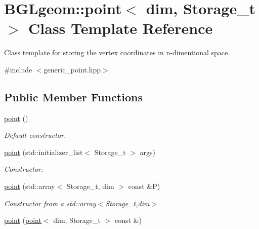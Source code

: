 \hypertarget{classBGLgeom_1_1point}{
\section{BGLgeom::point$<$ dim, Storage\_\-t $>$ Class Template Reference}
\label{classBGLgeom_1_1point}
}


Class template for storing the vertex coordinates in n-\/dimentional space.  


{\ttfamily \#include $<$generic\_\-point.hpp$>$}\subsection*{Public Member Functions}
\begin{DoxyCompactItemize}
\item 
\hypertarget{classBGLgeom_1_1point_a5d715364ccb806b626958305f83fce42}{
\hyperlink{classBGLgeom_1_1point_a5d715364ccb806b626958305f83fce42}{point} ()}
\label{classBGLgeom_1_1point_a5d715364ccb806b626958305f83fce42}

\begin{DoxyCompactList}\small\item\em Default constructor. \item\end{DoxyCompactList}\item 
\hypertarget{classBGLgeom_1_1point_ab6d7d66d53ead7f1991313428332788f}{
\hyperlink{classBGLgeom_1_1point_ab6d7d66d53ead7f1991313428332788f}{point} (std::initializer\_\-list$<$ Storage\_\-t $>$ args)}
\label{classBGLgeom_1_1point_ab6d7d66d53ead7f1991313428332788f}

\begin{DoxyCompactList}\small\item\em Constructor. \item\end{DoxyCompactList}\item 
\hypertarget{classBGLgeom_1_1point_a09b2bcc39f9c58927ad16e431689cb01}{
\hyperlink{classBGLgeom_1_1point_a09b2bcc39f9c58927ad16e431689cb01}{point} (std::array$<$ Storage\_\-t, dim $>$ const \&P)}
\label{classBGLgeom_1_1point_a09b2bcc39f9c58927ad16e431689cb01}

\begin{DoxyCompactList}\small\item\em Constructor from a std::array$<$Storage\_\-t,dim$>$. \item\end{DoxyCompactList}\item 
\hypertarget{classBGLgeom_1_1point_a5ded672a7d6c3fb64558f07c794a46d5}{
\hyperlink{classBGLgeom_1_1point_a5ded672a7d6c3fb64558f07c794a46d5}{point} (\hyperlink{classBGLgeom_1_1point}{point}$<$ dim, Storage\_\-t $>$ const \&)}
\label{classBGLgeom_1_1point_a5ded672a7d6c3fb64558f07c794a46d5}


\end{DoxyCompactItemize}

